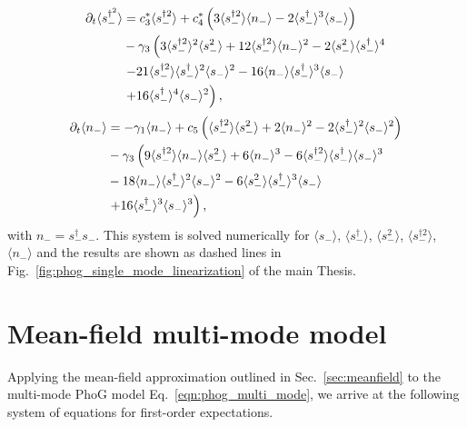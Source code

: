 \begin{align}
%
%
\partial_t\langle s_-^{\dagger^2} \rangle &= c_3^* \langle s_-^{\dagger 2}\rangle + c_4^* \left(3 \langle s_-^{\dagger 2} \rangle \langle n_- \rangle - 2 \langle s_-^\dagger \rangle^3 \langle s_- \rangle \right) \notag \\
%
&- \gamma_3 \left(3 \langle s_-^{\dagger 2} \rangle^2 \langle s_-^2 \rangle + 12 \langle s_-^{\dagger 2} \rangle \langle n_- \rangle^2 - 2\langle s_-^2 \rangle \langle s_-^\dagger \rangle^4 \right. \notag \\
%
&\left. - 21 \langle s_-^{\dagger 2}\rangle \langle s_-^\dagger\rangle^2 \langle s_- \rangle^2 - 16 \langle n_- \rangle \langle s_-^\dagger \rangle^3 \langle s_-\rangle \right. \notag \\
%
& \left.+ 16 \langle s_-^\dagger\rangle^4 \langle s_- \rangle^2 \right),\notag
\end{align}
\begin{align}\label{eqn:expectations_linear_last}
%
%
\partial_t \langle n_- \rangle &= - \gamma_1 \langle n_- \rangle + c_5 \left( \langle s_-^{\dagger 2} \rangle \langle s_-^2 \rangle + 2 \langle n_- \rangle^2 - 2 \langle s_-^\dagger \rangle^2 \langle s_- \rangle^2 \right) \notag \\
%
&- \gamma_3 \left( 9 \langle s_-^{\dagger 2} \rangle \langle n_-  \rangle \langle s_-^2\rangle + 6 \langle n_-\rangle^3  - 6 \langle s_-^{\dagger 2}\rangle \langle s_-^\dagger \rangle \langle s_- \rangle^3 \right. \notag \\
%
& - 18 \langle n_- \rangle \langle s_-^\dagger \rangle^2 \langle s_- \rangle^2 - 6 \langle s_-^2 \rangle \langle s_-^\dagger \rangle^3 \langle s_- \rangle \notag \\
%
& \left. + 16 \langle s_-^\dagger \rangle^3 \langle s_-\rangle^3 \right),
\end{align}
with $n_- = s_-^\dagger s_-$. This system is solved numerically for $\langle s_- \rangle$, $\langle s_-^\dagger \rangle$, $\langle s_-^2\rangle$, $\langle s_-^{\dagger 2}\rangle$, $\langle n_-\rangle$ and the results are shown as dashed lines in Fig.~\ref{fig:phog_single_mode_linearization} of the main Thesis.

\section{Mean-field multi-mode model}\label{appendix:mean_field}
Applying the mean-field approximation outlined in Sec.~\ref{sec:meanfield} to the multi-mode PhoG model Eq.~\ref{eqn:phog_multi_mode}, we arrive at the following system of equations for first-order expectations.

